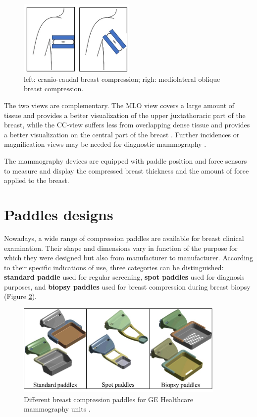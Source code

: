 \begin{figure}[!h]
\centering
\includegraphics[width=0.5\textwidth,keepaspectratio]{figures/cc_mlo_view.jpg} 
\caption{left: cranio-caudal breast compression; righ: mediolateral oblique breast compression. }
\label{fig:cc_mlo_view}
\end{figure}

 The two views are complementary. The MLO view covers a large amount of tissue and provides a better visualization of the upper juxtathoracic part of the breast, while the CC-view suffers less from overlapping dense tissue and provides a better visualization on the central part of the breast \citep{chan_image_1987,kim_computer_2006}.  Further incidences or magnification views may be needed for diagnostic mammography \citep{groot_towards_2015}.
 

The mammography devices are equipped with paddle position and force sensors to measure and display the compressed breast thickness and the amount of force applied to the breast.

\section{Paddles designs} \label{section:compressionpaddlesdesign}

Nowadays, a wide range of compression paddles are available for breast clinical examination. Their shape and dimensions vary in function of the purpose for which they were designed but also from manufacturer to manufacturer. According to their specific
indications of use, three categories can be distinguished: \textbf{standard paddle} used for regular screening, \textbf{spot paddles} used for diagnosis purposes, and \textbf{biopsy paddles} used for breast compression during breast biopsy (Figure \ref{fig:compressionpaddlestypes}). 


\begin{figure}[!h]
\centering
\includegraphics[width=0.9\textwidth,keepaspectratio]{figures/compressionpaddlestypes.jpg} 
\caption{Different breast compression paddles for GE Healthcare mammography units .}\label{fig:compressionpaddlestypes}
\end{figure}
    

